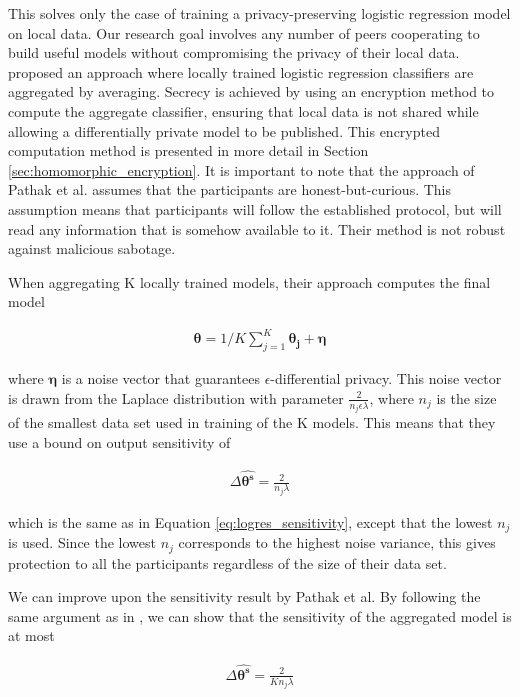 This solves only the case of training a privacy-preserving logistic regression model on local data. Our research goal involves any number of peers cooperating to build useful models without compromising the privacy of their local data. \cite{pathak2010diffprivhomo} proposed an approach where locally trained logistic regression classifiers are aggregated by averaging. Secrecy is achieved by using an encryption method to compute the aggregate classifier, ensuring that local data is not shared while allowing a differentially private model to be published. This encrypted computation method is presented in more detail in Section \ref{sec:homomorphic_encryption}. It is important to note that the approach of Pathak et al. assumes that the participants are honest-but-curious. This assumption means that participants will follow the established protocol, but will read any information that is somehow available to it. Their method is not robust against malicious sabotage. 

When aggregating K locally trained models, their approach computes the final model

\begin{eqnarray}
\label{eq:parametric_aggregation}
\boldsymbol{\theta} = 1/K\sum_{j=1}^{K} \boldsymbol{\theta_j} + \boldsymbol{\eta}
\end{eqnarray}


where $\boldsymbol{\eta}$ is a noise vector that guarantees $\epsilon$-differential privacy. This noise vector is drawn from the Laplace distribution with parameter $\frac{2}{n_j\epsilon\lambda}$, where $n_j$ is the size of the smallest data set used in training of the K models. This means that they use a bound on output sensitivity of 

\begin{eqnarray}
\label{eq:aggregated_logistic_sensitivity}
\Delta\boldsymbol{\hat{\theta^s}} = \frac{2}{n_j\lambda}
\end{eqnarray}


which is the same as in Equation \ref{eq:logres_sensitivity}, except that the lowest $n_j$ is used. Since the lowest $n_j$ corresponds to the highest noise variance, this gives protection to all the participants regardless of the size of their data set.

We can improve upon the sensitivity result by Pathak et al. By following the same argument as in \cite{pathak2010diffprivhomo}, we can show that the sensitivity of the aggregated model is at most 

\begin{eqnarray}
\label{eq:aggregated_logistic_sensitivity_stronger}
\Delta\boldsymbol{\hat{\theta^s}} = \frac{2}{K n_j	\lambda}
\end{eqnarray}

